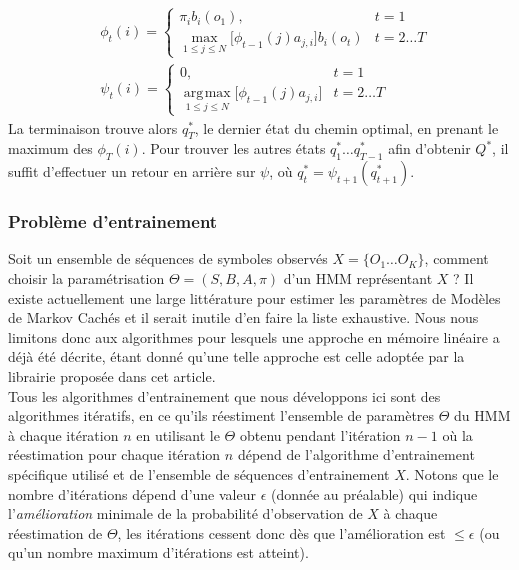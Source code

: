 \documentclass[letterpaper]{article}
\DeclareMathOperator*{\argmax}{\arg\!\max}
\begin{document}
\begin{equation} \label{eq:viterbi}
\begin{aligned}
	& \phi_t(i) = 
		\begin{cases} 
		\pi_i b_i(o_1), & t=1 \\
		\max\limits_{1\leq j \leq N} \Big[ \phi_{t-1}(j)a_{j,i} \Big] b_i(o_t) & t=2\dots T
		\end{cases} 
	\\
	& \psi_t(i) = 
		\begin{cases}
		0, & t=1 \\
		\argmax\limits_{1 \leq j \leq N} \Big[ \phi_{t-1}(j)a_{j,i} \Big]	& t=2\dots T
		\end{cases}
\end{aligned}
\end{equation}
La terminaison trouve alors $q_T^*$, le dernier état du chemin optimal, en prenant le maximum des $\phi_T(i)$. Pour trouver les autres états $q_1^*\dots q_{T-1}^*$ afin d'obtenir $Q^*$, il suffit d'effectuer un retour en arrière sur $\psi$, où $q_t^* = \psi_{t+1}(q_{t+1}^*)$.

\subsubsection{Problème d'entrainement}
Soit un ensemble de séquences de symboles observés $ X = \{O_1\dots O_K\}$, comment choisir la paramétrisation $\Theta = (S, B, A, \pi)$ d'un HMM représentant $X$ ? Il existe actuellement une large littérature pour estimer les paramètres de Modèles de Markov Cachés et il serait inutile d'en faire la liste exhaustive. Nous nous limitons donc aux algorithmes pour lesquels une approche en mémoire linéaire a déjà été décrite, étant donné qu'une telle approche est celle adoptée par la librairie proposée dans cet article. \\

Tous les algorithmes d'entrainement que nous développons ici sont des algorithmes itératifs, en ce qu'ils réestiment l'ensemble de paramètres $\Theta$ du HMM à chaque itération $n$ en utilisant le $\Theta$ obtenu pendant l'itération $n-1$ où la réestimation pour chaque itération $n$ dépend de l'algorithme d'entrainement spécifique utilisé et de l'ensemble de séquences d'entrainement $X$. Notons que le nombre d'itérations dépend d'une valeur $\epsilon$ (donnée au préalable) qui indique l'\textit{amélioration} minimale de la probabilité d'observation de $X$ à chaque réestimation de $\Theta$, les itérations cessent donc dès que l'amélioration est $\leq \epsilon$ (ou qu'un nombre maximum d'itérations est atteint).
\end{document}

